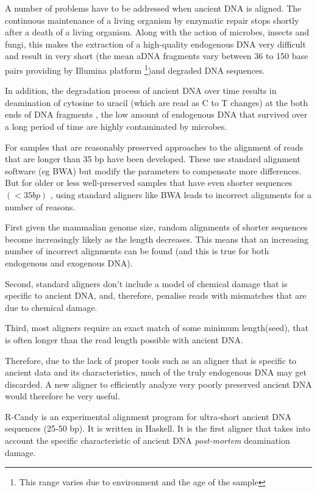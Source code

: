 \documentclass[11pt,a4paper]{report}
\begin{document}
A number of problems have to be addressed when ancient DNA is aligned.
The continuous maintenance of a living organism by enzymatic repair stops 
shortly after a death of a living organism. Along with the action of
microbes, insects and fungi, this makes the extraction of a 
high-quality endogenous DNA very difficult and result in very short (the 
mean aDNA fragments vary between 36 to 150 base pairs providing by Illumina 
platform\cite{rizzi2012ancient} \footnote{This range varies due to environment 
and the age of the sample})and degraded DNA sequences\cite{paabo2004genetic}.
 
In addition, the degradation process of ancient DNA over time results 
in deamination of cytosine to uracil (which are read as C to T changes) 
at the both ends of DNA fragments \cite{futureofaDNA}, the low amount 
of endogenous DNA that survived over a long period of time are highly 
contaminated \cite{paabo2004genetic}\cite{aDNA}by microbes.

For samples that are reasonably preserved approaches to the alignment
of reads that are longer than 35 bp have been developed. These use standard
alignment software (eg BWA) but modify the parameters to compensate more 
differences. But for older or less well-preserved samples that have even
shorter sequences $(<35 bp)$ \cite{meyer2014mitochondrial}, using standard
aligners like BWA leads to incorrect alignments for a number of reasons.

First given the mammalian genome size, random alignments of shorter 
sequences become increasingly likely as the length decreases. 
This means that an increasing number of incorrect alignments can be 
found (and this is true for both endogenous and exogenous DNA).

Second, standard aligners don't include a model of chemical damage that 
is specific to ancient DNA, and, therefore, penalise reads with mismatches
that are due to chemical damage.

Third, most aligners require an exact match of some minimum length(seed), 
that is often longer than the read length possible with ancient DNA.

Therefore, due to the lack of proper tools such as an aligner that is 
specific to ancient data and its characteristics, much of the truly 
endogenous DNA may get discarded. A new aligner to efficiently analyze 
very poorly preserved ancient DNA would therefore be very useful.

R-Candy is an experimental alignment program for ultra-short ancient DNA sequences 
(25-50 bp). It is written in Haskell. It is the first aligner that takes 
into account the specific characteristic of ancient DNA \emph{post-mortem} 
deamination damage.
\end{document}
